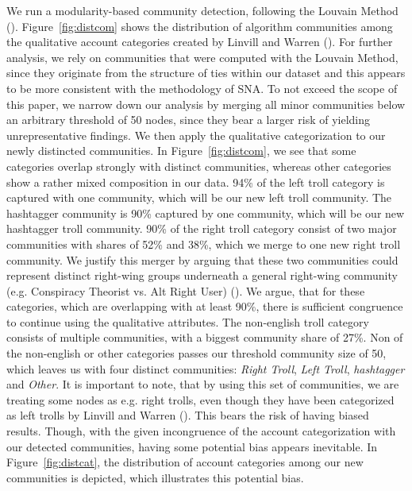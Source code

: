 \documentclass[12pt, titlepage=true, toc=bib]{scrartcl}
\begin{document}
We run a modularity-based community detection, following the Louvain Method (\cite{blondel_fast_2008}). Figure~\ref{fig:distcom} shows the distribution of algorithm communities among the qualitative account categories created by Linvill and Warren (\cite*{linvill_troll_2018}). For further analysis, we rely on communities that were computed with the Louvain Method, since they originate from the structure of ties within our dataset and this appears to be more consistent with the methodology of SNA. To not exceed the scope of this paper, we narrow down our analysis by merging all minor communities below an arbitrary threshold of 50 nodes, since they bear a larger risk of yielding unrepresentative findings. We then apply the qualitative categorization to our newly distincted communities. In Figure~\ref{fig:distcom}, we see that some categories overlap strongly with distinct communities, whereas other categories show a rather mixed composition in our data. 94\% of the left troll category is captured with one community, which will be our new left troll community. The hashtagger community is 90\% captured by one community, which will be our new hashtagger troll community. 90\% of the right troll category consist of two major communities with shares of 52\% and 38\%, which we merge to one new right troll community. We justify this merger by arguing that these two communities could represent distinct right-wing groups underneath a general right-wing community (e.g. Conspiracy Theorist vs. Alt Right User) (\cite[cf.]{kaiser_unite_2018}). We argue, that for these categories, which are overlapping with at least 90\%, there is sufficient congruence to continue using the qualitative attributes. The non-english troll category consists of multiple communities, with a biggest community share of 27\%. Non of the non-english or other categories passes our threshold community size of 50, which leaves us with four distinct communities: \textit{Right Troll}, \textit{Left Troll}, \textit{hashtagger} and \textit{Other}. It is important to note, that by using this set of communities, we are treating some nodes as e.g. right trolls, even though they have been categorized as left trolls by Linvill and Warren (\cite*{linvill_troll_2018}). This bears the risk of having biased results. Though, with the given incongruence of the account categorization with our detected communities, having some potential bias appears inevitable. In Figure~\ref{fig:distcat}, the distribution of account categories among our new communities is depicted, which illustrates this potential bias.
\end{document}
